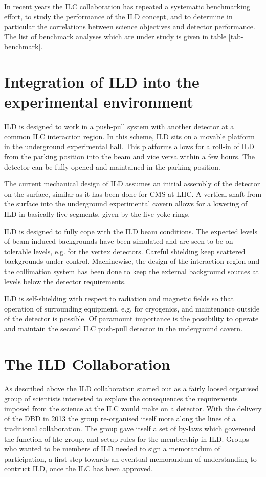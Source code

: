 \documentclass[%
 amsmath,amssymb,
 aps,
]{revtex4-1}
\begin{document}
In recent years the ILC collaboration has repeated a systematic benchmarking effort, to study the performance of the ILD concept, and to determine in particular the correlations between science objectives and detector performance. The list of benchmark analyses which are under study is given in table \ref{tab-benchmark}. 


\section{Integration of ILD into the experimental environment}
ILD is designed to work in a push-pull system with another detector at a common ILC interaction region. In this scheme, ILD sits on a movable platform in the underground experimental hall. This platforms allows for a roll-in of ILD from the parking position into the beam and vice versa within a few hours. The detector can be fully opened and maintained in the parking position.

The current mechanical design of ILD assumes an initial assembly of the detector on the surface, similar as it has been done for CMS at LHC. A vertical shaft from the surface into the underground experimental cavern allows for a lowering of ILD in basically five segments, given by the five yoke rings.

ILD is designed to fully cope with the ILD beam conditions. The expected levels of beam induced backgrounds have been simulated and are seen to be on tolerable levels, e.g. for the vertex detectors. Careful shielding keep scattered backgrounds under control. Machinewise, the design of the interaction region and the collimation system has been done to keep the external background sources at levels below the detector requirements.

ILD is self-shielding with respect to radiation and magnetic fields so that operation of surrounding equipment, e.g. for cryogenics, and maintenance outside of the detector is possible. Of paramount importance is the possibility to operate and maintain the second ILC push-pull detector in the underground cavern.

\section{The ILD Collaboration}
As described above the ILD collaboration started out as a fairly loosed organised group of scientists interested to explore the consequences the requirements imposed from the science at the ILC would make on a detector. With the delivery of the DBD in 2013 the group re-organised itself more along the lines of a traditional collaboration. The group gave itself a set of by-laws which goverened the function of hte group, and setup rules for the membership in ILD. Groups who wanted to be members of ILD needed to sign a memorandum of participation, a first step towards an eventual memorandum of understanding to contruct ILD, once the ILC has been approved. 
\end{document}
